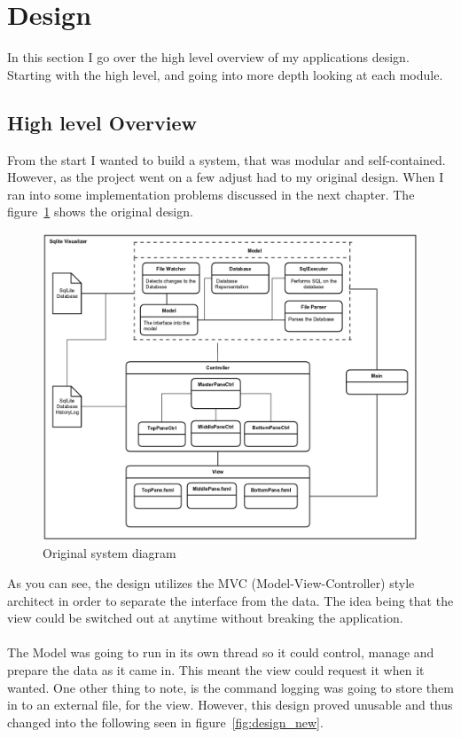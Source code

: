 \section{Design}
\label{sec:design}

In this section I go over the high level overview of my applications design. Starting with the high level, and going into more depth looking at each module.

\subsection{High level Overview}
\label{subsec:high_level_overview}

From the start I wanted to build a system, that was modular and self-contained. However, as the project went on a few adjust had to my original design. When I ran into some implementation problems discussed in the next chapter. The figure~\ref{fig:design_old} shows the original design.

\begin{figure}[H]
	\centering
	\includegraphics[scale=0.2]{images/system_diagram_old.png}
	\caption{Original system diagram}
	\label{fig:design_old}
\end{figure}

As you can see, the design utilizes the MVC (Model-View-Controller) style architect in order to separate the interface from the data. The idea being that the view could be switched out at anytime without breaking the application.
\\\\
The Model was going to run in its own thread so it could control, manage and prepare the data as it came in. This meant the view could request it when it wanted. One other thing to note, is the command logging was going to store them in to an external file, for the view. However, this design proved unusable and thus changed into the following seen in figure~\ref{fig:design_new}. 

